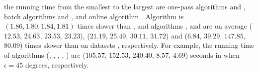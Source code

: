  the running time from the smallest to the
largest are one-pass algorithms \intersec and \interval, batch algorithms \tpa and \dpa, and online algorithm \opwa.
%
%
Algorithm \interval is $(1.86,1.80, 1.84, 1.81)$ times slower than \intersec, and algorithms \tpa, \dpa and \opwa are on average
($12.53$, $24.63$, $23.53$, $23.23$), ($21.19$, $25.49$, $30.11$, $31.72$) and ($6.84$, $39.29$, $147.85$, $80.09$)
times slower than \intersec on datasets \dSets, respectively.
%
For example, the running time of algorithms
(\tpa, \dpa, \opwa, \interval, \intersec) are ($105.57$, $152.53$, $240.40$, $8.57$, $4.69$) seconds in \mopsi when
$\epsilon=45$ degrees, respectively.

